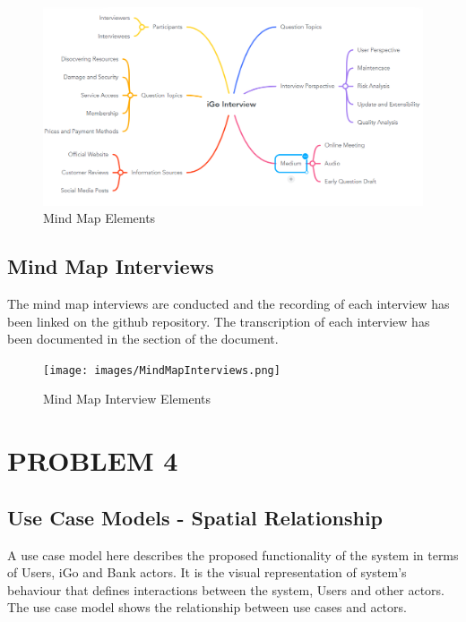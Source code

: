 \begin{figure}[H]
    \centering
    \includegraphics[scale=0.60]{images/MindMapElements.png}
    \caption{Mind Map Elements}
\end{figure}

\newpage
\subsection{Mind Map Interviews}
The mind map interviews are conducted and the recording of each interview has been linked on the github repository. The transcription of each interview has been documented in the  section of the document.

\begin{figure}[H]
    \texttt{[image: images/MindMapInterviews.png]}
    \caption{Mind Map Interview Elements}
\end{figure}

\section{PROBLEM 4}
\subsection{Use Case Models - Spatial Relationship}
A use case model here describes the proposed functionality of the system in terms of Users, iGo and Bank actors. It is the visual representation of system's behaviour that defines interactions between the system, Users and other actors. The use case model shows the relationship between use cases and actors.\cite{Unlock}

